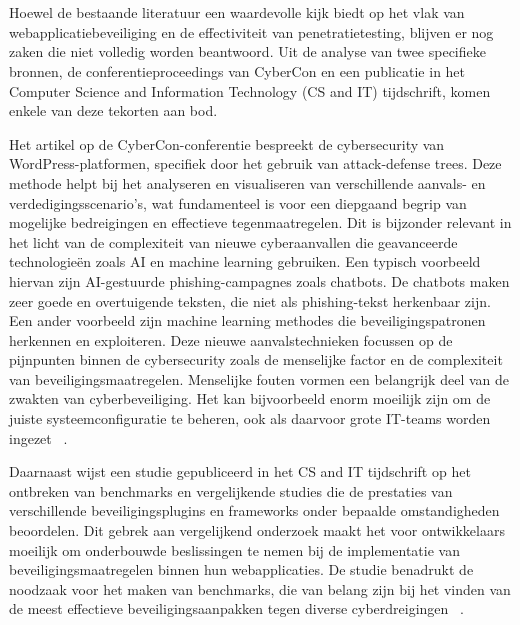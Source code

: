 \section{}
Hoewel de bestaande literatuur een waardevolle kijk biedt op het vlak van webapplicatiebeveiliging en de effectiviteit van penetratietesting, blijven er nog 
zaken die niet volledig worden beantwoord. Uit de analyse van twee specifieke bronnen, de conferentieproceedings van CyberCon en een publicatie in het 
Computer Science and Information Technology (CS and IT) tijdschrift, komen enkele van deze tekorten aan bod.

Het artikel op de CyberCon-conferentie bespreekt de cybersecurity van WordPress-platformen, specifiek door het gebruik van attack-defense trees. Deze methode helpt 
bij het analyseren en visualiseren van verschillende aanvals- en verdedigingsscenario's, wat fundamenteel is voor een diepgaand begrip van mogelijke bedreigingen en 
effectieve tegenmaatregelen. Dit is bijzonder relevant in het licht van de complexiteit van nieuwe cyberaanvallen die geavanceerde technologieën zoals AI en machine 
learning gebruiken. Een typisch voorbeeld hiervan zijn AI-gestuurde phishing-campagnes zoals chatbots. De chatbots maken zeer goede en overtuigende teksten, die niet als 
phishing-tekst herkenbaar zijn. Een ander voorbeeld zijn machine learning methodes die beveiligingspatronen herkennen en exploiteren. Deze nieuwe aanvalstechnieken
focussen op de pijnpunten binnen de cybersecurity zoals de menselijke factor en de complexiteit van beveiligingsmaatregelen. Menselijke fouten vormen een belangrijk 
deel van de zwakten van cyberbeveiliging. Het kan bijvoorbeeld enorm moeilijk zijn om de juiste systeemconfiguratie te beheren, ook als daarvoor grote IT-teams worden 
ingezet ~\autocite{Petrica2022}.

Daarnaast wijst een studie gepubliceerd in het CS and IT tijdschrift op het ontbreken van benchmarks en vergelijkende studies die de prestaties van verschillende 
beveiligingsplugins en frameworks onder bepaalde omstandigheden beoordelen. Dit gebrek aan vergelijkend onderzoek maakt het voor ontwikkelaars 
moeilijk om onderbouwde beslissingen te nemen bij de implementatie van beveiligingsmaatregelen binnen hun webapplicaties. De studie benadrukt de noodzaak voor 
het maken van benchmarks, die van belang zijn bij het vinden van de meest effectieve beveiligingsaanpakken tegen diverse cyberdreigingen ~\autocite{AbuDabaseh2018}.

